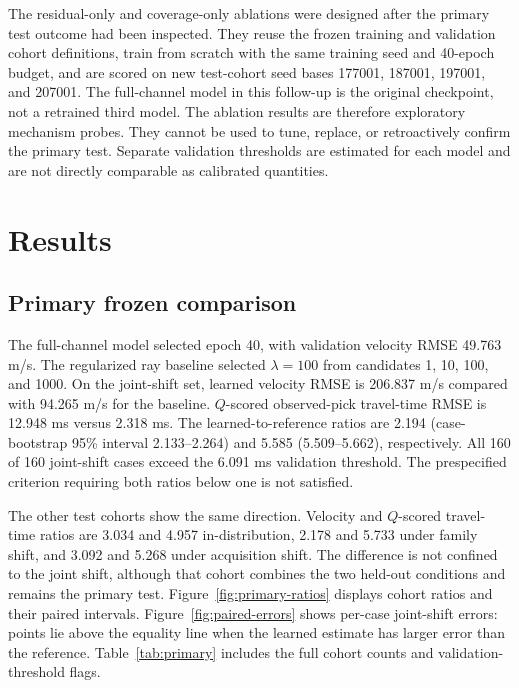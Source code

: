 \documentclass[11pt]{article}
\begin{document}
The residual-only and coverage-only ablations were designed after the primary test outcome had been inspected. They reuse the frozen training and validation cohort definitions, train from scratch with the same training seed and 40-epoch budget, and are scored on new test-cohort seed bases 177001, 187001, 197001, and 207001. The full-channel model in this follow-up is the original checkpoint, not a retrained third model. The ablation results are therefore exploratory mechanism probes. They cannot be used to tune, replace, or retroactively confirm the primary test. Separate validation thresholds are estimated for each model and are not directly comparable as calibrated quantities.



\section{Results}
\label{sec:results}
\subsection{Primary frozen comparison}
\label{sec:primary-results}
The full-channel model selected epoch 40, with validation velocity RMSE 49.763 m/s. The regularized ray baseline selected $\lambda=100$ from candidates 1, 10, 100, and 1000. On the joint-shift set, learned velocity RMSE is 206.837 m/s compared with 94.265 m/s for the baseline. $Q$-scored observed-pick travel-time RMSE is 12.948 ms versus 2.318 ms. The learned-to-reference ratios are 2.194 (case-bootstrap 95\% interval 2.133--2.264) and 5.585 (5.509--5.662), respectively. All 160 of 160 joint-shift cases exceed the 6.091 ms validation threshold. The prespecified criterion requiring both ratios below one is not satisfied.

The other test cohorts show the same direction. Velocity and $Q$-scored travel-time ratios are 3.034 and 4.957 in-distribution, 2.178 and 5.733 under family shift, and 3.092 and 5.268 under acquisition shift. The difference is not confined to the joint shift, although that cohort combines the two held-out conditions and remains the primary test. Figure~\ref{fig:primary-ratios} displays cohort ratios and their paired intervals. Figure~\ref{fig:paired-errors} shows per-case joint-shift errors: points lie above the equality line when the learned estimate has larger error than the reference. Table~\ref{tab:primary} includes the full cohort counts and validation-threshold flags.
\end{document}
